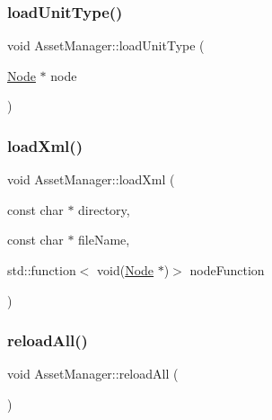 \mbox{\label{class_asset_manager_acda0591566b5fc9dd11264dfb384a700}} 
\subsubsection{\texorpdfstring{load\+Unit\+Type()}{loadUnitType()}}
{\footnotesize\ttfamily void Asset\+Manager\+::load\+Unit\+Type (\begin{DoxyParamCaption}\item[{\hyperlink{class_asset_manager_1_1_node}{Node} $\ast$}]{node }\end{DoxyParamCaption})\hspace{0.3cm}{\ttfamily [private]}}

\mbox{\label{class_asset_manager_aec40b122db2f081d2b06de1f759897ed}} 
\subsubsection{\texorpdfstring{load\+Xml()}{loadXml()}}
{\footnotesize\ttfamily void Asset\+Manager\+::load\+Xml (\begin{DoxyParamCaption}\item[{const char $\ast$}]{directory,  }\item[{const char $\ast$}]{file\+Name,  }\item[{std\+::function$<$ void(\hyperlink{class_asset_manager_1_1_node}{Node} $\ast$)$>$}]{node\+Function }\end{DoxyParamCaption})\hspace{0.3cm}{\ttfamily [private]}}

\mbox{\label{class_asset_manager_ad6a75fed1cd03286eae6bb12a5a5d3d3}} 
\subsubsection{\texorpdfstring{reload\+All()}{reloadAll()}}
{\footnotesize\ttfamily void Asset\+Manager\+::reload\+All (\begin{DoxyParamCaption}{ }\end{DoxyParamCaption})}

